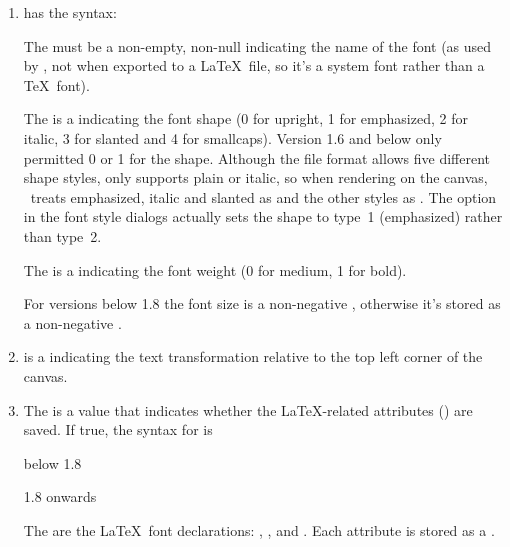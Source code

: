\begin{numbered}
\begin{enumerate}
  \item\label{jdr:fontspecs}  has the syntax:
  \begin{syntaxline}
     
  \end{syntaxline}
  The  must be a non-empty, non-null 
  indicating the name of the font (as used by \FlowframTk, not
  when exported to a \LaTeX\ file, so it's a system font rather than a
  \TeX\ font).

  The  is a  indicating the font shape (0 for
  upright, 1 for emphasized, 2 for italic, 3 for slanted and 4 for
  smallcaps).  Version 1.6 and below only permitted 0 or 1 for the shape.
  Although the file format allows five different shape styles,
   only supports plain or italic, so when
  rendering on the \gls{canvas}, \FlowframTk\ treats emphasized,
  italic and slanted as  and the other styles as
  . The  option
  in the font style dialogs actually sets the shape to type~1 (emphasized) rather
  than type~2.

  The  is a  indicating the font weight (0 for medium,
  1 for bold).

  For versions below 1.8 the font size is a non-negative
  , otherwise it's stored as a non-negative
  .

  \item {} is a  indicating the
  text transformation relative to the top left corner of the
  \gls{canvas}.

  \item\label{jdr:latexspecs} The  is a  value that indicates
  whether the \LaTeX-related attributes () are saved.
  If true, the syntax for  is
  \begin{jdrversion}{below 1.8}
  \begin{syntaxline}
     
  \end{syntaxline}
  \end{jdrversion}
  \begin{jdrversion}{1.8 onwards}
  \begin{syntaxline}
     
   
  \end{syntaxline}
  \end{jdrversion}
  The  are the \LaTeX\ font declarations: ,
  ,  and . Each attribute is
  stored as a .


\end{enumerate}
\end{numbered}
